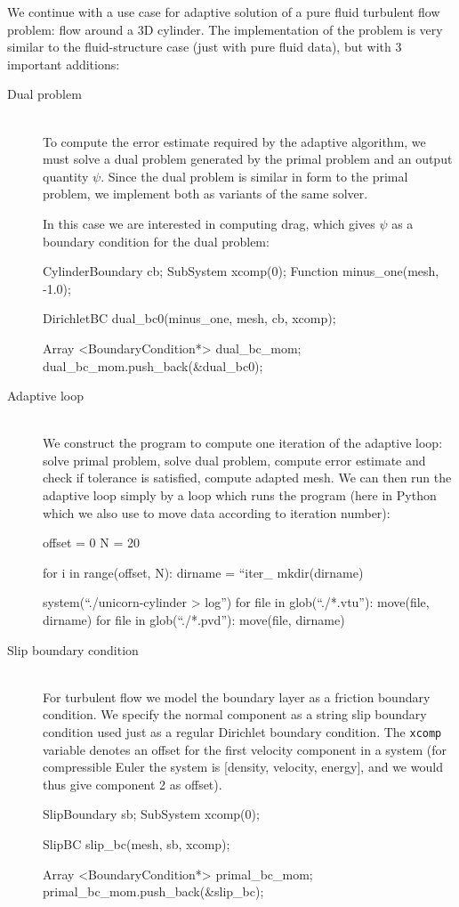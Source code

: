 We continue with a use case for adaptive solution of a pure fluid
turbulent flow problem: flow around a 3D cylinder. The implementation
of the problem is very similar to the fluid-structure case (just with
pure fluid data), but with 3 important additions:
\begin{description}
\item[Dual problem]
\ \\
To compute the error estimate required by the adaptive algorithm, we
must solve a dual problem generated by the primal problem and an
output quantity $\psi$. Since the dual problem is similar in form to
the primal problem, we implement both as variants of the same solver.

In this case we are interested in computing drag, which gives $\psi$
as a boundary condition for the dual problem:

\begin{c++}
CylinderBoundary cb;
SubSystem xcomp(0);
Function minus_one(mesh, -1.0);

DirichletBC dual_bc0(minus_one, mesh, cb, xcomp);

Array <BoundaryCondition*> dual_bc_mom;
dual_bc_mom.push_back(&dual_bc0);
\end{c++}


\item[Adaptive loop]
\ \\
We construct the program to compute one iteration of the adaptive
loop: solve primal problem, solve dual problem, compute error estimate
and check if tolerance is satisfied, compute adapted mesh. We can then
run the adaptive loop simply by a loop which runs the program (here in
Python which we also use to move data according to iteration number):


\begin{python}
offset = 0
N = 20

for i in range(offset, N):
    dirname = ``iter_%
    mkdir(dirname)

    system(``./unicorn-cylinder > log'')
    for file in glob(``./*.vtu''):
    move(file, dirname)
    for file in glob(``./*.pvd''):
    move(file, dirname)
\end{python}


\item[Slip boundary condition]
\ \\
For turbulent flow we model the boundary layer as a friction boundary
condition. We specify the normal component as a string slip boundary
condition used just as a regular Dirichlet boundary condition. The
{\tt xcomp} variable denotes an offset for the first velocity
component in a system (for compressible Euler the system is [density,
velocity, energy], and we would thus give component 2 as offset).

\begin{c++}
SlipBoundary sb;
SubSystem xcomp(0);

SlipBC slip_bc(mesh, sb, xcomp);

Array <BoundaryCondition*> primal_bc_mom;
primal_bc_mom.push_back(&slip_bc);
\end{c++}


\end{description}


